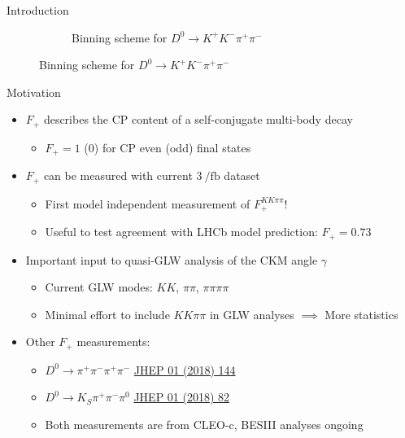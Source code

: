 \documentclass{beamer}
\begin{document}
\begin{frame}{Introduction}
\begin{figure}
\begin{subfigure}{0.5\textwidth}
      \caption{Binning scheme for $D^0\to K^+K^-\pi^+\pi^-$}
    \end{subfigure}
  \end{figure}
\end{frame}

\begin{frame}{Motivation}
  \begin{itemize}
    \setlength\itemsep{1.0em}
    \item{$F_+$ describes the CP content of a self-conjugate multi-body decay}
    \begin{itemize}
      \item{$F_+ = 1$ ($0$) for CP even (odd) final states}
    \end{itemize}
    \item{$F_+$ can be measured with current $\SI{3}{\per\femto\barn}$ dataset}
    \begin{itemize}
      \item{First model independent measurement of $F_+^{KK\pi\pi}$!}
      \item{Useful to test agreement with LHCb model prediction: $F_+ = 0.73$}
    \end{itemize}
    \item{Important input to quasi-GLW analysis of the CKM angle $\gamma$}
    \begin{itemize}
      \item{Current GLW modes: $KK$, $\pi\pi$, $\pi\pi\pi\pi$}
      \item{Minimal effort to include $KK\pi\pi$ in GLW analyses $\implies$ More statistics}
    \end{itemize}
    \item{Other $F_+$ measurements:}
    \begin{itemize}
      \item{$D^0\to\pi^+\pi^-\pi^+\pi^-$ \href{https://arxiv.org/abs/1709.03467}{JHEP 01 (2018) 144}}
      \item{$D^0\to K_S\pi^+\pi^-\pi^0$ \href{https://arxiv.org/abs/1710.10086}{JHEP 01 (2018) 82}}
      \item{Both measurements are from CLEO-c, BESIII analyses ongoing}
    \end{itemize}
  \end{itemize}
\end{frame}
\end{document}
